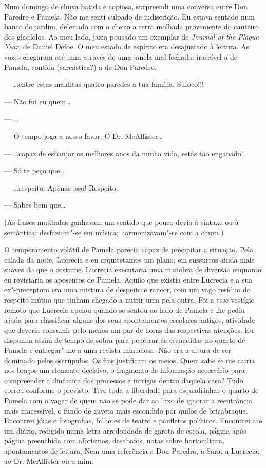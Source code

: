 Num domingo de chuva batida e copiosa, surpreendi uma conversa entre Don
Paredro e Pamela. Não me senti culpado de indiscrição. Eu estava sentado
num banco do jardim, deleitado com o cheiro a terra molhada
proveniente do canteiro dos gladíolos. Ao meu lado, jazia pousado um
exemplar de \emph{Journal of the Plague Year, }de Daniel Defoe. O meu
estado de espírito era desajustado à leitura. As vozes chegaram até mim
através de uma janela mal fechada: irascível a de Pamela, contida
(sarcástica?) a de Don Paredro.

--- \ldots{}entre estas malditas quatro paredes a tua família.
Sufoco!!!

--- Não fui eu quem\ldots{}

--- \ldots{}

--- O tempo joga a nosso favor. O Dr. McAllister\ldots{}

--- \ldots{}capaz de esbanjar os melhores anos da minha vida, estás tão
  enganado!

--- Só te peço que\ldots{}

--- \ldots{}respeito. Apenas isso! Respeito.

--- Sabes bem que\ldots{}

(As frases mutiladas ganhavam um sentido que pouco devia à sintaxe ou
à semântica; desfaziam"-se em música; harmonizavam"-se com a chuva.)

O temperamento volátil de Pamela parecia capaz de precipitar a
situação. Pela calada da noite, Lucrecia e eu arquitetamos um plano,
em sussurros ainda mais suaves do que o costume. Lucrecia executaria uma
manobra de diversão enquanto eu revistaria os aposentos de Pamela.
Aquilo que existia entre Lucrecia e a sua ex"-preceptora era uma mistura
de despeito e rancor, com um vago resíduo do respeito mútuo que tinham
chegado a nutrir uma pela outra. Foi a esse vestígio remoto que Lucrecia
apelou quando se sentou ao lado de Pamela e lhe pediu ajuda para
classificar alguns dos seus apontamentos escolares antigos, atividade
que deveria consumir pelo menos um par de horas das respectivas
atenções. Eu dispunha assim de tempo de sobra para penetrar às escondidas no quarto de Pamela e entregar"-me a uma revista minuciosa. Não
era a altura de ser dominado pelos escrúpulos. Os fins justificam os
meios. Quem sabe se me cairia nos braços um elemento decisivo, o
fragmento de informação necessário para compreender a dinâmica dos
processos e intrigas dentro daquela casa? Tudo correu conforme o
previsto. Tive toda a liberdade para esquadrinhar o quarto de Pamela com
o vagar de quem não se pode dar ao luxo de ignorar a reentrância mais
inacessível, o fundo de gaveta mais escondido por quilos de
bricabraque. Encontrei jóias e fotografias, bilhetes de teatro e
panfletos políticos. Encontrei até um diário, redigido numa letra
arredondada de garota de escola, página após página preenchida com
aforismos, desabafos, notas sobre horticultura, apontamentos de
leitura. Nem uma referência a Don Paredro, a Sara, a Lucrecia, ao Dr.
McAllister ou a mim.

